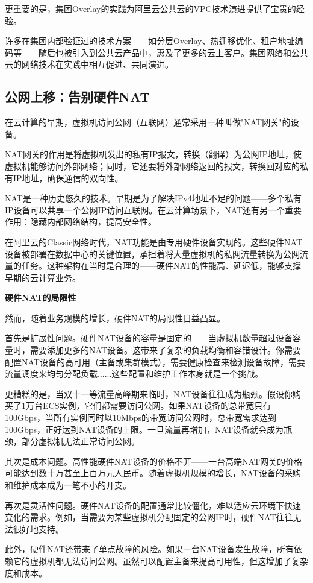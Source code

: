 更重要的是，集团Overlay的实践为阿里云公共云的VPC技术演进提供了宝贵的经验。

许多在集团内部验证过的技术方案——如分层Overlay、热迁移优化、租户地址编码等——随后也被引入到公共云产品中，惠及了更多的云上客户。集团网络和公共云的网络技术在实践中相互促进、共同演进。

\subsection{公网上移：告别硬件NAT}

在云计算的早期，虚拟机访问公网（互联网）通常采用一种叫做"NAT网关"的设备。

NAT网关的作用是将虚拟机发出的私有IP报文，转换（翻译）为公网IP地址，使虚拟机能够访问外部网络；同时，它还要将外部网络返回的报文，转换回对应的私有IP地址，确保通信的双向性。

NAT是一种历史悠久的技术。早期是为了解决IPv4地址不足的问题——多个私有IP设备可以共享一个公网IP访问互联网。在云计算场景下，NAT还有另一个重要作用：隐藏内部网络结构，提高安全性。

在阿里云的Classic网络时代，NAT功能是由专用硬件设备实现的。这些硬件NAT设备被部署在数据中心的关键位置，承担着将大量虚拟机的私网流量转换为公网流量的任务。这种架构在当时是合理的——硬件NAT的性能高、延迟低，能够支撑早期的云计算业务。

\textbf{硬件NAT的局限性}

然而，随着业务规模的增长，硬件NAT的局限性日益凸显。

首先是扩展性问题。硬件NAT设备的容量是固定的——当虚拟机数量超过设备容量时，需要添加更多的NAT设备。这带来了复杂的负载均衡和容错设计。你需要配置NAT设备的高可用（主备或集群模式），需要健康检查来检测设备故障，需要流量调度来均匀分配负载......这些配置和维护工作本身就是一个挑战。

更糟糕的是，当双十一等流量高峰期来临时，NAT设备往往成为瓶颈。假设你购买了1万台ECS实例，它们都需要访问公网。如果NAT设备的总带宽只有100Gbps，当所有实例同时以10Mbps的带宽访问公网时，总带宽需求达到100Gbps，正好达到NAT设备的上限。一旦流量再增加，NAT设备就会成为瓶颈，部分虚拟机无法正常访问公网。

其次是成本问题。高性能硬件NAT设备的价格不菲——一台高端NAT网关的价格可能达到数十万甚至上百万元人民币。随着虚拟机规模的增长，NAT设备的采购和维护成本成为一笔不小的开支。

再次是灵活性问题。硬件NAT设备的配置通常比较僵化，难以适应云环境下快速变化的需求。例如，当需要为某些虚拟机分配固定的公网IP时，硬件NAT往往无法很好地支持。

此外，硬件NAT还带来了单点故障的风险。如果一台NAT设备发生故障，所有依赖它的虚拟机都无法访问公网。虽然可以配置主备来提高可用性，但这增加了复杂度和成本。

